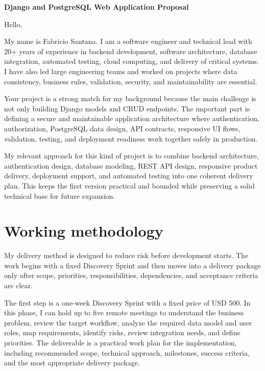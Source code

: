 \documentclass[11pt,a4paper]{article}
\begin{document}
\begin{center}
{\LARGE\bfseries Django and PostgreSQL Web Application Proposal}
\end{center}
\vspace{0.5em}

Hello,\par

My name is Fabricio Santana. I am a software engineer and technical lead with 20+ years of experience in backend development, software architecture, database integration, automated testing, cloud computing, and delivery of critical systems. I have also led large engineering teams and worked on projects where data consistency, business rules, validation, security, and maintainability are essential.\par

Your project is a strong match for my background because the main challenge is not only building Django models and CRUD endpoints. The important part is defining a secure and maintainable application architecture where authentication, authorization, PostgreSQL data design, API contracts, responsive UI flows, validation, testing, and deployment readiness work together safely in production.\par

My relevant approach for this kind of project is to combine backend architecture, authentication design, database modeling, REST API design, responsive product delivery, deployment support, and automated testing into one coherent delivery plan. This keeps the first version practical and bounded while preserving a solid technical base for future expansion.\par

\section*{Working methodology}

My delivery method is designed to reduce risk before development starts. The work begins with a fixed Discovery Sprint and then moves into a delivery package only after scope, priorities, responsibilities, dependencies, and acceptance criteria are clear.\par

The first step is a one-week Discovery Sprint with a fixed price of USD 500. In this phase, I can hold up to five remote meetings to understand the business problem, review the target workflow, analyze the required data model and user roles, map requirements, identify risks, review integration needs, and define priorities. The deliverable is a practical work plan for the implementation, including recommended scope, technical approach, milestones, success criteria, and the most appropriate delivery package.\par
\end{document}
